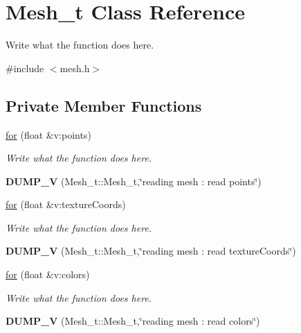 \hypertarget{classMesh__t}{\section{Mesh\+\_\+t Class Reference}
\label{classMesh__t}
}


Write what the function does here.  




{\ttfamily \#include $<$mesh.\+h$>$}

\subsection*{Private Member Functions}
\begin{DoxyCompactItemize}
\item 
\hyperlink{classMesh__t_ae6a8037a5d56597d4e5b46dd58140644}{for} (float \&v\+:points)
\begin{DoxyCompactList}\small\item\em Write what the function does here. \end{DoxyCompactList}\item 
\hypertarget{classMesh__t_a87f8038ca29ddfaa458723133306823f}{{\bfseries D\+U\+M\+P\+\_\+\+V} (Mesh\+\_\+t\+::\+Mesh\+\_\+t,\char`\"{}reading mesh \+: read points\char`\"{})}\label{classMesh__t_a87f8038ca29ddfaa458723133306823f}

\item 
\hyperlink{classMesh__t_af6ffcba9611347f2df45b549c5d42e1e}{for} (float \&v\+:texture\+Coords)
\begin{DoxyCompactList}\small\item\em Write what the function does here. \end{DoxyCompactList}\item 
\hypertarget{classMesh__t_a759223d0280b52d907391052fe8e4d05}{{\bfseries D\+U\+M\+P\+\_\+\+V} (Mesh\+\_\+t\+::\+Mesh\+\_\+t,\char`\"{}reading mesh \+: read texture\+Coords\char`\"{})}\label{classMesh__t_a759223d0280b52d907391052fe8e4d05}

\item 
\hyperlink{classMesh__t_a81a0dcdf8e20a1490ae445695c90de26}{for} (float \&v\+:colors)
\begin{DoxyCompactList}\small\item\em Write what the function does here. \end{DoxyCompactList}\item 
\hypertarget{classMesh__t_ac55fa446a7481af216062a935d0171cb}{{\bfseries D\+U\+M\+P\+\_\+\+V} (Mesh\+\_\+t\+::\+Mesh\+\_\+t,\char`\"{}reading mesh \+: read colors\char`\"{})}\label{classMesh__t_ac55fa446a7481af216062a935d0171cb}

\end{DoxyCompactItemize}
